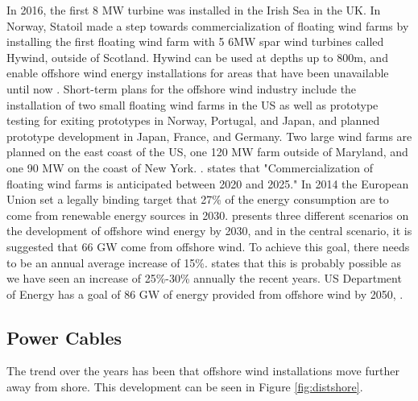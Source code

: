  \noindent In 2016, the first 8 MW turbine was installed in the Irish Sea in the UK. In Norway, Statoil made a step towards commercialization of floating wind farms by installing the first floating wind farm with 5 6MW spar wind turbines called Hywind, outside of Scotland. Hywind can be used at depths up to 800m, and enable offshore wind energy installations for areas that have been unavailable until now \cite{Equinor2018}. Short-term plans for the offshore wind industry include the installation of two small floating wind farms in the US as well as prototype testing for exiting prototypes in Norway, Portugal, and Japan, and planned prototype development in Japan, France, and Germany.  Two large wind farms are planned on the east coast of the US, one 120 MW farm outside of Maryland, and one 90 MW on the coast of New York. \cite{Gao2018}. \newline
 \newline
 \cite{Bailey2014} states that "Commercialization of floating wind farms is
anticipated between 2020 and 2025." In 2014 the European Union set a legally binding target that 27\% of the energy consumption are to come from renewable energy sources in 2030. \cite{EWEA2015}  presents three different scenarios on the development of offshore wind energy by 2030, and in the central scenario, it is suggested that 66 GW come from offshore wind. To achieve this goal, there needs to be an annual average increase of 15\%. \cite{Gao2018} states that this is probably possible as we have seen an increase of 25\%-30\% annually the recent years. US Department of Energy has a goal of 86 GW of energy provided from offshore wind by 2050, \cite{windus2016}. 
\subsection{Power Cables}
The trend over the years has been that offshore wind installations move further away from shore. This development can be seen in Figure \ref{fig:distshore}. 

